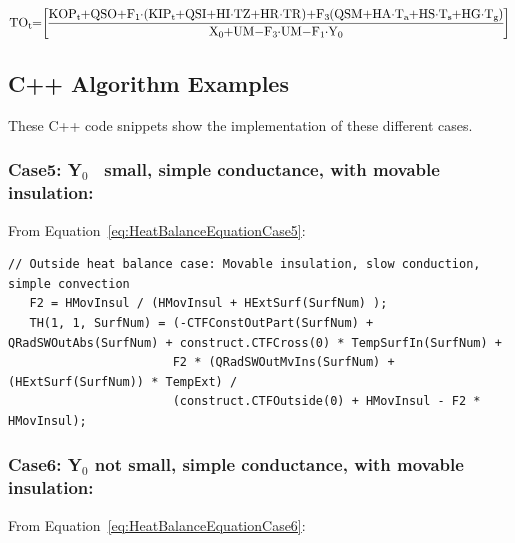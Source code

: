 \begin{equation}
\medmuskip=0mu
\thinmuskip=0mu
\thickmuskip=0mu
\nulldelimiterspace=0pt
\scriptspace=0pt
{\rm{T}}{{\rm{O}}_{\rm{t}}}{\rm{ = }}\left[ {\frac{{{\rm{KO}}{{\rm{P}}_{\rm{t}}} + {\rm{QSO}} + {{\rm{F}}_1}\cdot \left( {{\rm{KI}}{{\rm{P}}_{\rm{t}}}{\rm{ + QSI + HI}}\cdot {\rm{TZ + HR}}\cdot {\rm{TR}}} \right){\rm{ + }}{{\rm{F}}_{\rm{3}}}\left( {{\rm{QSM + HA}}\cdot {{\rm{T}}_{\rm{a}}}{\rm{ + HS}}\cdot {{\rm{T}}_{\rm{s}}}{\rm{ + HG}}\cdot {{\rm{T}}_{\rm{g}}}} \right)}}{{{{\rm{X}}_{\rm{0}}}{\rm{ + UM - }}{{\rm{F}}_{\rm{3}}}\cdot {\rm{UM - }}{{\rm{F}}_{\rm{1}}}\cdot {{\rm{Y}}_{\rm{0}}}}}} \right]{\rm{  }}
\label{eq:HeatBalanceEquationCase8}
\end{equation}

\subsection{C++ Algorithm Examples}\label{c++-algorithm-examples}

These C++ code snippets show the implementation of these different cases.

\subsubsection{Case5: Y\(_{0}\)~ small, simple conductance, with movable insulation:}\label{case5-yux5f0-small-simple-conductance-with-movable-insulation-1}

From Equation~\ref{eq:HeatBalanceEquationCase5}:

\begin{lstlisting}
// Outside heat balance case: Movable insulation, slow conduction, simple convection
   F2 = HMovInsul / (HMovInsul + HExtSurf(SurfNum) );
   TH(1, 1, SurfNum) = (-CTFConstOutPart(SurfNum) + QRadSWOutAbs(SurfNum) + construct.CTFCross(0) * TempSurfIn(SurfNum) +
                       F2 * (QRadSWOutMvIns(SurfNum) + (HExtSurf(SurfNum)) * TempExt) /
                       (construct.CTFOutside(0) + HMovInsul - F2 * HMovInsul);
\end{lstlisting}

\subsubsection{Case6: Y\(_{0}\) not small, simple conductance, with movable insulation:}\label{case6-yux5f0-not-small-simple-conductance-with-movable-insulation-1}

From Equation~\ref{eq:HeatBalanceEquationCase6}:

